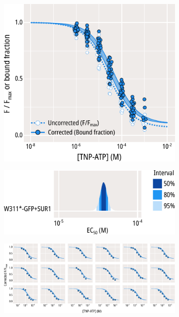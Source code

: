 \begin{figure}[h]
	\centering
	\begin{subfigure}[t]{0.45\textwidth}
		\caption{}\label{ch3fig:tnpatp_quenching_1}
		\centering
		\includegraphics[width=\textwidth]{tnpatp_quenching_1.pdf}
	\end{subfigure}
	\hfill
	\begin{subfigure}[t]{0.45\textwidth}
		\caption{}\label{ch3fig:ec50_fits_3}
		\centering
		\includegraphics[width=\textwidth]{ec50_fits_3.pdf}
	\end{subfigure}
	\vfill
	\begin{subfigure}[t]{0.9\textwidth}
		\caption{}\label{ch3fig:tnpatp_quenching_2}
		\centering
		\includegraphics[width=\textwidth]{tnpatp_quenching_2.pdf}

\end{subfigure}
\end{figure}
